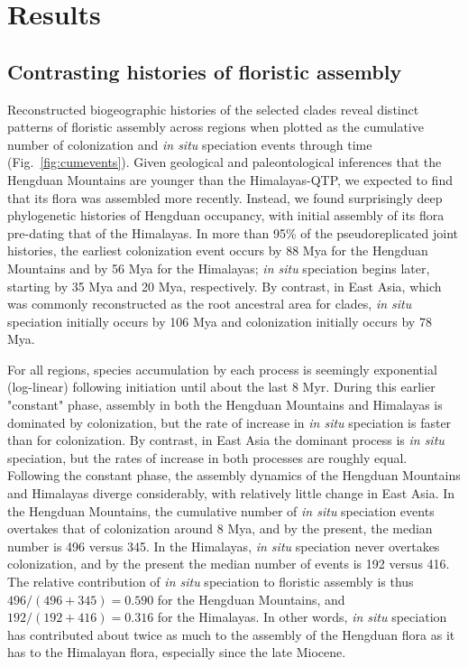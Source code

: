 \section{Results}

\subsection{Contrasting histories of floristic assembly}

Reconstructed biogeographic histories of the selected clades reveal distinct patterns of floristic assembly across regions when plotted as the cumulative number of colonization and \textit{in situ} speciation events through time (Fig.~\ref{fig:cumevents}). Given geological and paleontological inferences that the Hengduan Mountains are younger than the Himalayas-QTP, we expected to find that its flora was assembled more recently. Instead, we found surprisingly deep phylogenetic histories of Hengduan occupancy, with initial assembly of its flora pre-dating that of the Himalayas. In more than 95\% of the pseudoreplicated joint histories, the earliest colonization event occurs by 88 Mya for the Hengduan Mountains and by 56 Mya for the Himalayas; \textit{in situ} speciation begins later, starting by 35 Mya and 20 Mya, respectively. By contrast, in East Asia, which was commonly reconstructed as the root ancestral area for clades, \textit{in situ} speciation initially occurs by 106 Mya and colonization initially occurs by 78 Mya.

For all regions, species accumulation by each process is seemingly exponential (log-linear) following initiation until about the last 8 Myr. During this earlier "constant" phase, assembly in both the Hengduan Mountains and Himalayas is dominated by colonization, but the rate of increase in \textit{in situ} speciation is faster than for colonization. By contrast, in East Asia the dominant process is \textit{in situ} speciation, but the rates of increase in both processes are roughly equal. Following the constant phase, the assembly dynamics of the Hengduan Mountains and Himalayas diverge considerably, with relatively little change in East Asia. In the Hengduan Mountains, the cumulative number of \textit{in situ} speciation events overtakes that of colonization around 8 Mya, and by the present, the median number is 496 versus 345. In the Himalayas, \textit{in situ} speciation never overtakes colonization, and by the present the median number of events is 192 versus 416. The relative contribution of \textit{in situ} speciation to floristic assembly is thus $496/(496+345) = 0.590$ for the Hengduan Mountains, and $192/(192+416) = 0.316$ for the Himalayas. In other words, \textit{in situ} speciation has contributed about twice as much to the assembly of the Hengduan flora as it has to the Himalayan flora, especially since the late Miocene.

